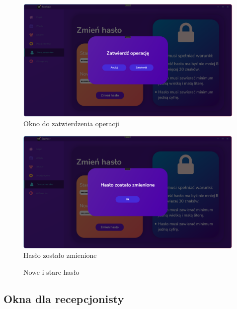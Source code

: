 \begin{flushleft}
    \begin{figure}[H]
        \begin{center}
	\includegraphics[height=6cm]{images/zatw_oper.png}
        \caption{Okno do zatwierdzenia operacji}
        \label{fig:zatw_oper}
	\end{center}
    \end{figure}
    \begin{figure}[H]
        \begin{center}
	\includegraphics[height=6cm]{images/haslo_zos_zmien_katpa.png}
        \caption{Hasło zostało zmienione}
        \label{fig:haslo_zost_zmien}
	\end{center}
    \end{figure}
    \begin{figure}[H]
    \centering
    \caption{Nowe i stare hasło}
    \end{figure}
    \subsection{\Large{Okna dla recepcjonisty}}

\end{flushleft}
